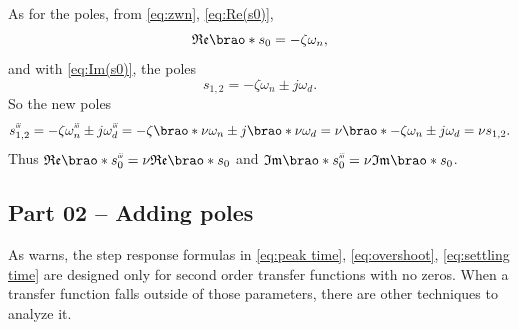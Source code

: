 \documentclass[12pt]{article}
\DeclarePairedDelimiter\brao()%
\newcommand{\setprime}[2][1]{%
    {#2}^{%
        \raisebox{1pt}{%
            \scalebox{0.5}{%
                \itshape\sffamily\uppercase%
                \expandafter{%
                    \romannumeral#1%
                }%
            }%
        }
    }%
}%
\begin{document}
\begin{enumerate}[(a)]
        As for the poles, from \eqref{eq:zwn}, \eqref{eq:Re(s0)},
        \begin{equation}
            \mathfrak{Re}\brao*{s_0} = -\zeta\omega_n,
        \end{equation}
        and with \eqref{eq:Im(s0)}, the poles
        \begin{equation}
            s_{1,2} = -\zeta\omega_n \pm j\omega_d.
        \end{equation}
        So the new poles
        \begin{equation}
              \setprime[3]s_{1,2}
            = -\zeta\setprime[3]\omega_n \pm j\setprime[3]\omega_d
            = -\zeta\brao*{\nu\omega_n} \pm j\brao*{\nu\omega_d}
            = \nu\brao*{-\zeta\omega_n \pm j\omega_d}
            = \nu s_{1,2}.
        \end{equation}
        Thus $\mathfrak{Re}\brao*{\setprime[3]s_0} = \nu\mathfrak{Re}\brao*{s_0}$
        and $\mathfrak{Im}\brao*{\setprime[3]s_0} = \nu\mathfrak{Im}\brao*{s_0}$.
\end{enumerate}

\subsection{Part 02 -- Adding poles}

As \citet{nise2015a} warns,
the step response formulas in \ref{eq:peak time}, \ref{eq:overshoot}, \ref{eq:settling time} are designed only for second order transfer functions with no zeros.
When a transfer function falls outside of those parameters, there are other techniques to analyze it.
\end{document}
